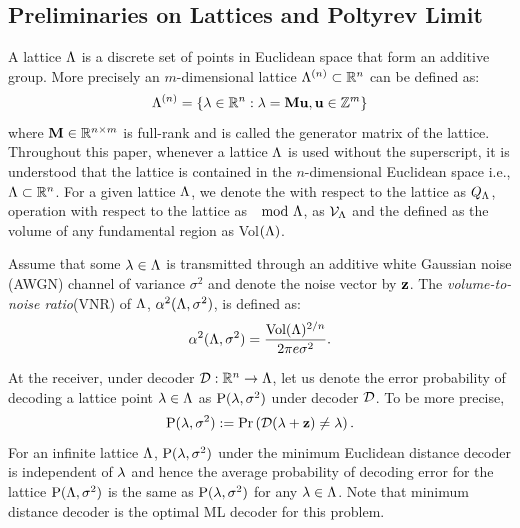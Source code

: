 \documentclass[journal,twocolumn]{IEEEtran}
\begin{document}
\subsection{Preliminaries on Lattices and Poltyrev Limit}
A lattice $\Lambda$ is a discrete set of points in Euclidean space that form an additive group. More precisely an $m$-dimensional lattice $\Lambda^{(n)}\subset \mathbb{R}^{n}$ can be defined as:
\begin{equation}
\Lambda^{(n)} =\{\lambda\in\mathbb{R}^{n}:\lambda=\mathbf{M}\mathbf{u},\mathbf{u}\in \mathbb{Z}^{m}\}
\end{equation}
where $\mathbf{M}\in\mathbb{R}^{n \times m}$ is full-rank and is called the generator matrix of the lattice. Throughout this paper, whenever a lattice $\Lambda$ is used without the superscript, it is understood that the lattice is contained in the $n$-dimensional Euclidean space i.e., $\Lambda\subset \mathbb{R}^{n}$. For a given lattice $\Lambda$, we denote the  with respect to the lattice as $Q_{\Lambda}$,   operation with respect to the lattice as $\mod {\Lambda}$,   as $\mathcal{V}_{\Lambda}$ and the  defined as the volume of any fundamental region as Vol$(\Lambda)$\cite{erez2004achieving}.

Assume that some $\mathbf{\lambda}\in\Lambda$ is transmitted through an additive white Gaussian noise (AWGN) channel of variance $\sigma^{2}$ and denote the noise vector by $\mathbf{z}$. The \textit{volume-to-noise ratio}(VNR) of $\Lambda$, $\alpha^{2}(\Lambda,\sigma^{2})$, is defined as:
\begin{equation}\label{Eqn:VNRDefinition}
\alpha^{2}(\Lambda,\sigma^{2})=\frac{\text{Vol}(\Lambda)^{2/n}}{2\pi e\sigma^{2}}.
\end{equation}

At the receiver, under decoder $\mathcal{D}:\mathbb{R}^{n}\rightarrow\Lambda$, let us denote the error probability of decoding a lattice point $\lambda\in\Lambda$ as $\text{P}(\mathbf{\lambda},\sigma^{2})$ under decoder $\mathcal{D}$. To be more precise,  %
\begin{equation*}
 \text{P}(\mathbf{\lambda},\sigma^{2}):=\Pr\left(\mathcal{D}(\mathbf{\lambda}+\mathbf{z})\neq  \lambda\right).
\end{equation*}
For an infinite lattice $\Lambda$, $\text{P}(\lambda,\sigma^{2})$ under the minimum Euclidean distance decoder is independent of $\lambda$ and hence the average probability of decoding error for the lattice  $\text{P}(\Lambda,\sigma^{2})$ is the same as $\text{P}(\lambda,\sigma^{2})$ for any $\lambda\in \Lambda$. Note that minimum distance decoder is the optimal ML decoder for this problem.
\end{document}
